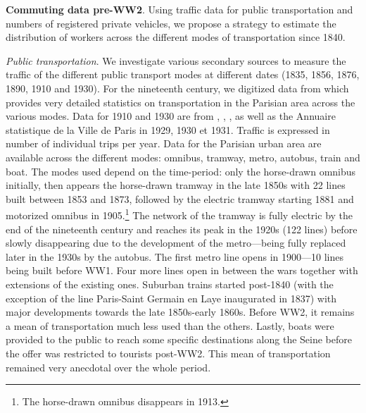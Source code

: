\documentclass[11pt]{report}
\begin{document}
\noindent\textbf{Commuting data pre-WW2}. Using traffic data for public transportation and numbers of registered private vehicles, we propose a strategy to estimate the distribution of workers across the different modes of transportation since 1840. 

\noindent\textit{Public transportation}. We investigate various secondary sources to measure the traffic of the different public transport modes at different dates (1835, 1856, 1876, 1890, 1910 and 1930). For the nineteenth century, we digitized data from \cite{martin1894etude} which provides very detailed statistics on transportation in the Parisian area across the various modes. Data for 1910 and 1930 are from \cite{bertillon1910accroissement}, \cite{brunet1986mouvement}, \cite{merlin1997transports}, as well as the Annuaire statistique de la Ville de Paris in 1929, 1930 et 1931. Traffic is expressed in number of individual trips per year. Data for the Parisian urban area are available across the different modes: omnibus, tramway, metro, autobus, train and boat. The modes used depend on the time-period: only the horse-drawn omnibus initially, then appears the horse-drawn tramway in the late 1850s with 22 lines built between 1853 and 1873, followed by the electric tramway starting 1881 and motorized omnibus in 1905.\footnote{The horse-drawn omnibus disappears in 1913.} The network of the tramway is fully electric by the end of the nineteenth century and reaches its peak in the 1920s (122 lines) before slowly disappearing due to the development of the metro---being fully replaced later in the 1930s by the autobus. The first metro line opens in 1900---10 lines being built before WW1. Four more lines open in between the wars together with extensions of the existing ones. Suburban trains started post-1840 (with the exception of the line Paris-Saint Germain en Laye inaugurated in 1837) with major developments towards the late 1850s-early 1860s. Before WW2, it remains a mean of transportation much less used than the others. Lastly, boats were provided to the public to reach some specific destinations along the Seine before the offer was restricted to tourists post-WW2. This mean of transportation remained very anecdotal over the whole period.  
\end{document}
